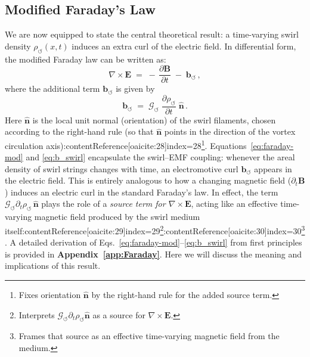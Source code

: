 \documentclass[12pt]{article}
\begin{document}
    \subsection*{Modified Faraday's Law}
        We are now equipped to state the central theoretical result: a time-varying swirl density $\rho_{\!\boldsymbol{\circlearrowleft}}(x,t)$ induces an extra curl of the electric field. In differential form, the modified Faraday law can be written as:
        \begin{equation}\label{eq:faraday-mod}
        \nabla \times \mathbf{E} \;=\; -\,\frac{\partial \mathbf{B}}{\partial t}\;-\;\mathbf{b}_{\!\boldsymbol{\circlearrowleft}}\,,
        \end{equation}
        where the additional term $\mathbf{b}_{\!\boldsymbol{\circlearrowleft}}$ is given by
        \begin{equation}\label{eq:b_swirl}
        \mathbf{b}_{\!\boldsymbol{\circlearrowleft}} \;=\; \mathcal{G}_{\!\boldsymbol{\circlearrowleft}}\;\frac{\partial \rho_{\!\boldsymbol{\circlearrowleft}}}{\partial t}\;\hat{\mathbf{n}}\,.
        \end{equation}
        Here $\hat{\mathbf{n}}$ is the local unit normal (orientation) of the swirl filaments, chosen according to the right-hand rule (so that $\hat{\mathbf{n}}$ points in the direction of the vortex circulation axis):contentReference[oaicite:28]{index=28}\footnote{Fixes orientation $\hat{\mathbf n}$ by the right-hand rule for the added source term.}. Equations~\eqref{eq:faraday-mod} and \eqref{eq:b_swirl} encapsulate the swirl--EMF coupling: whenever the areal density of swirl strings changes with time, an electromotive curl $\mathbf{b}_{\!\boldsymbol{\circlearrowleft}}$ appears in the electric field. This is entirely analogous to how a changing magnetic field ($\partial_t \mathbf{B}$) induces an electric curl in the standard Faraday’s law. In effect, the term $\mathcal{G}_{\!\boldsymbol{\circlearrowleft}}\partial_t \rho_{\!\boldsymbol{\circlearrowleft}}\,\hat{\mathbf{n}}$ plays the role of a \emph{source term for $\nabla \times \mathbf{E}$}, acting like an effective time-varying magnetic field produced by the swirl medium itself:contentReference[oaicite:29]{index=29}\footnote{Interprets $\mathcal G_{\!\circlearrowleft}\partial_t\rho_{\!\circlearrowleft}\hat{\mathbf n}$ as a source for $\nabla\times\mathbf E$.}:contentReference[oaicite:30]{index=30}\footnote{Frames that source as an effective time-varying magnetic field from the medium.}. A detailed derivation of Eqs.~\eqref{eq:faraday-mod}--\eqref{eq:b_swirl} from first principles is provided in \textbf{Appendix~\ref{app:Faraday}}. Here we will discuss the meaning and implications of this result.
\end{document}
